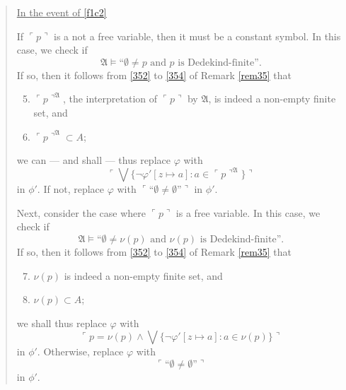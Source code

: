 \documentclass[12pt]{article}
\numberwithin{equation}{section}
\begin{document}
\begin{quote}
\begin{enumerate}[label=(\arabic*)]
\begin{enumerate}[label=(F\arabic*), leftmargin=30pt]
            \underline{In the event of \ref{f1c2}}
            
            If $\ulcorner p \urcorner$ is a not a free variable, then it must be a constant symbol. In this case, we check if 
            \begin{equation*}
                \mathfrak{A} \models \text{``}\emptyset \neq p \text{ and } p \text{ is Dedekind-finite''.}
            \end{equation*}
            If so, then it follows from \ref{352} to \ref{354} of Remark \ref{rem35} that 
            \begin{enumerate}[label=(\alph*)]
                \setcounter{enumiii}{4}
                \item $\ulcorner p \urcorner^{\mathfrak{A}}$, the interpretation of $\ulcorner p \urcorner$ by $\mathfrak{A}$, is indeed a non-empty finite set, and
                \item $\ulcorner p \urcorner^{\mathfrak{A}} \subset A$;
            \end{enumerate}
            we can --- and shall --- thus replace $\varphi$ with 
            \begin{equation*}
                \ulcorner \bigvee \{\neg \varphi'[z \mapsto a] : a \in \ulcorner p \urcorner^{\mathfrak{A}}\} \urcorner
            \end{equation*}
            in $\phi'$. If not, replace $\varphi$ with $\ulcorner \text{``} \emptyset \neq \emptyset \text{''} \urcorner$ in $\phi'$. 
        
            Next, consider the case where $\ulcorner p \urcorner$ is a free variable. In this case, we check if
            \begin{equation*}
                \mathfrak{A} \models \text{``}\emptyset \neq \nu(p) \text{ and } \nu(p) \text{ is Dedekind-finite''.}
            \end{equation*}
            If so, then it follows from \ref{352} to \ref{354} of Remark \ref{rem35} that 
            \begin{enumerate}[label=(\alph*)]
                \setcounter{enumiii}{6}
                \item $\nu(p)$ is indeed a non-empty finite set, and
                \item $\nu(p) \subset A$; 
            \end{enumerate}
            we shall thus replace $\varphi$ with
            \begin{equation*}
                \ulcorner p = \nu(p) \wedge \bigvee \{\neg \varphi'[z \mapsto a] : a \in \nu(p)\} \urcorner
            \end{equation*}
            in $\phi'$. Otherwise, replace $\varphi$ with 
            \begin{equation*}
                \ulcorner \text{``} \emptyset \neq \emptyset \text{''} \urcorner
            \end{equation*}
            in $\phi'$.
        \end{enumerate}
        

\end{enumerate}
\end{quote}
\end{document}
